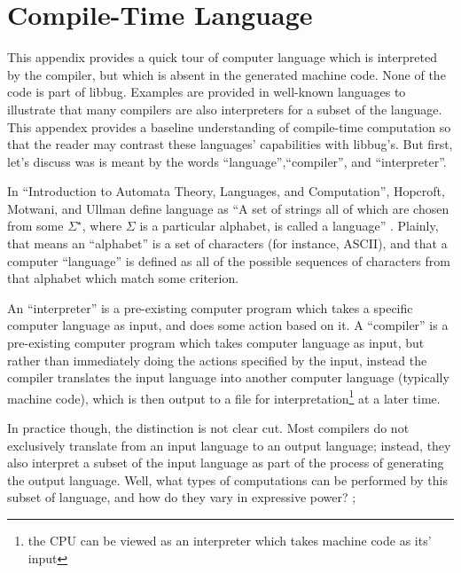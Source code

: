 
\appendix
 \appendixpage
 \noappendicestocpagenum
 \chapter{Compile-Time Language}
  \label{sec:appendix1}
 This appendix provides a quick tour of computer language which is interpreted
 by the compiler, but which is absent in the generated machine
 code.  None of the code is part of libbug.  Examples are provided in
 well-known languages to illustrate that
 many compilers are also interpreters for a subset of the language.  This
 appendex provides a baseline understanding of compile-time computation
 so that the reader may contrast these languages' capabilities with libbug's.
 But first, let's discuss was is meant by the words ``language'',``compiler'', and
 ``interpreter''.

 In ``Introduction to Automata Theory, Languages, and Computation'', Hopcroft,
 Motwani, and Ullman define language as ``A set of strings all of which are chosen
 from some $\Sigma^{\star}$, where $\Sigma$ is a particular alphabet, is called
 a language'' \cite[p. 30]{hmu2001}.
 Plainly, that means an ``alphabet'' is a set of characters (for instance, ASCII), and
 that a computer ``language'' is defined as all of the possible sequences of characters
 from that alphabet which match some criterion.

 An ``interpreter'' is a pre-existing computer program which takes a specific
 computer language as input,
 and does some action based on it.  A ``compiler'' is a pre-existing computer program
 which takes computer language as input,
 but rather than immediately doing the actions specified by the input, instead the compiler
 translates the input language
 into another computer language (typically machine code), which is then output to a file
 for interpretation\footnote{the CPU can be viewed as an
 interpreter which takes machine code as its' input} at a later time.

 In practice though, the distinction is not clear cut.  Most compilers do not exclusively
 translate from an input language
 to an output language; instead, they also interpret a subset of the input
 language as part of the process of generating the output language.  Well, what
 types of computations can be performed by this subset of language, and how do
 they vary in expressive power?
;
